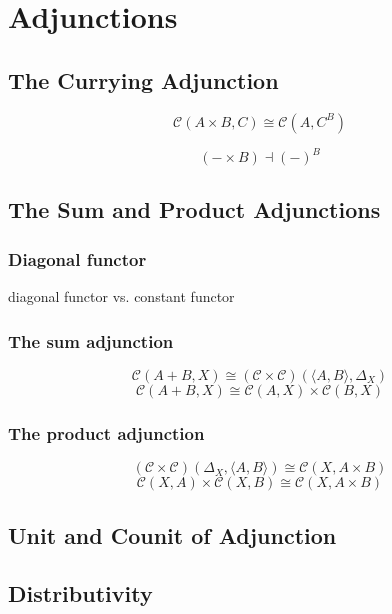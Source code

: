 \documentclass[DaoFP]{subfiles}
\begin{document}
\setcounter{chapter}{9}

\chapter{Adjunctions}



\section{The Currying Adjunction}

\[  \mathcal{C}(A \times B, C ) \cong  \mathcal{C} (A, C^B)  \]

\[ (- \times B) \dashv (-)^B \]

\section{The Sum and Product Adjunctions}


\subsection{Diagonal functor}
diagonal functor vs. constant functor

\subsection{The sum adjunction}
\[  \mathcal{C} (A + B, X) \cong (\mathcal{C} \times \mathcal{C})( \langle A, B \rangle , \Delta_X)\]
\[  \mathcal{C} (A + B, X) \cong \mathcal{C}( A , X) \times \mathcal{C}( B , X)\]

\subsection{The product adjunction}

\[  (\mathcal{C} \times \mathcal{C})( \Delta_X,  \langle A, B \rangle ) \cong  \mathcal{C} (X, A \times B)  \]
\[  \mathcal{C} (X, A) \times \mathcal{C}(X, B) \cong  \mathcal{C} (X, A \times B)  \]

\section{Unit and Counit of Adjunction}

\section{Distributivity}
\end{document}
